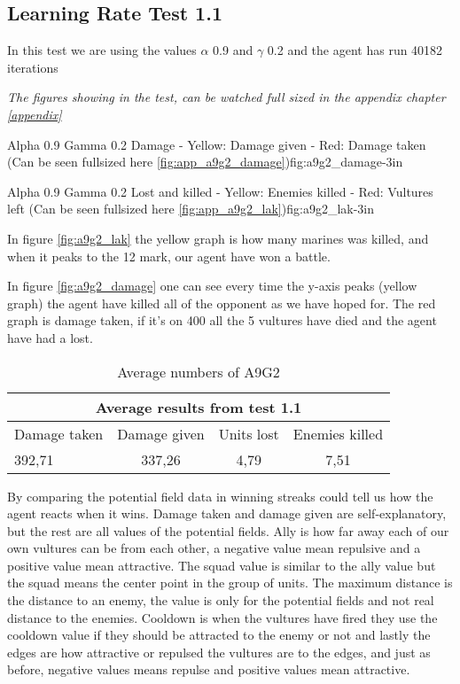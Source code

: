 \subsection*{Learning Rate Test 1.1}
In this test we are using the values $\alpha$ 0.9 and $\gamma$ 0.2 and the agent has run 40182 iterations


\textit{The figures showing in the test, can be watched full sized in the appendix chapter \ref{appendix}} 

			{Alpha 0.9 Gamma 0.2 Damage - Yellow: Damage given - Red: Damage taken (Can be seen fullsized here \ref{fig:app_a9g2_damage})}{fig:a9g2_damage}{-3in}

			{Alpha 0.9 Gamma 0.2 Lost and killed - Yellow: Enemies killed - Red: Vultures left (Can be seen fullsized here \ref{fig:app_a9g2_lak})}{fig:a9g2_lak}{-3in}
			
			
In figure \ref{fig:a9g2_lak} the yellow graph is how many marines was killed, and when it peaks to the 12 mark, our agent have won a battle.




In figure \ref{fig:a9g2_damage} one can see every time the y-axis peaks (yellow graph) the agent have killed all of the opponent as we have hoped for. The red graph is damage taken, if it's on 400 all the 5 vultures have died and the agent have had a lost.

\begin{centering}
\begin{table}
 \begin{tabular}{|l|c|c|c|}
	\multicolumn{4}{c}{Average results from test 1.1} \\
	\hline
		Damage taken & Damage given & Units lost & Enemies killed\\
	\hline
		392,71 & 337,26 & 4,79 & 7,51 \\
	\hline
\end{tabular}
\caption{Average numbers of A9G2}
\label{test1.1}
\end{table}
\end{centering}
\newpage
By comparing the potential field data in winning streaks could tell us how the agent reacts when it wins. Damage taken and damage given are self-explanatory, but the rest are all values of the potential fields. Ally is how far away each of our own vultures can be from each other, a negative value mean repulsive and a positive value mean attractive. The squad value is similar to the ally value but the squad means the center point in the group of units. The maximum distance is the distance to an enemy, the value is only for the potential fields and not real distance to the enemies. Cooldown is when the vultures have fired they use the cooldown value if they should be attracted to the enemy or not and lastly the edges are how attractive or repulsed the vultures are to the edges, and just as before, negative values means repulse and positive values mean attractive. 
\newpage
